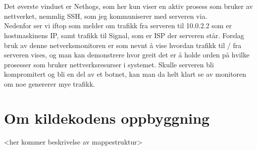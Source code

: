 \documentclass{article}
\begin{document}
\\ \\
Det øverste vinduet er Nethogs, som her kun viser en aktiv prosess som bruker av nettverket, nemmlig SSH, som jeg kommuniserer med serveren via. \\ 
Nedenfor ser vi iftop som melder om trafikk fra serveren til 10.0.2.2 som er hostmaskinens IP, samt trafikk til Signal, som er ISP der serveren står.
Forslag bruk av denne netverksmonitoren er som nevnt å vise hvordan trafikk til / fra serveren vises, og man kan demonstrere hvor greit det er å holde orden på hvilke prosesser som bruker nettverksresurser i systemet. Skulle serveren bli kompromitert og bli en del av et botnet, kan man da helt klart se av monitoren om noe genererer mye trafikk. 
\section{Om kildekodens oppbyggning}
<her kommer beskrivelse av mappestruktur>
\end{document}
